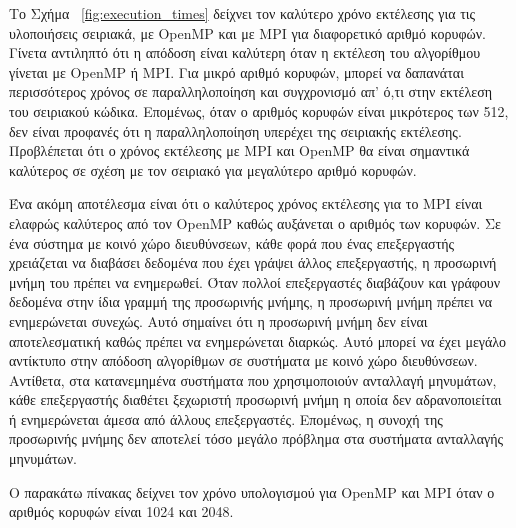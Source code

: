 \documentclass[12pt,a4paper]{article}
\begin{document}
 
Το Σχήμα ~\ref{fig:execution_times} δείχνει τον καλύτερο χρόνο εκτέλεσης για τις υλοποιήσεις σειριακά, με \foreignlanguage{english}{OpenMP} και με \foreignlanguage{english}{MPI} για διαφορετικό αριθμό κορυφών. Γίνετα αντιληπτό ότι η απόδοση είναι καλύτερη όταν η εκτέλεση του αλγορίθμου γίνεται με \foreignlanguage{english}{OpenMP} ή \foreignlanguage{english}{MPI}. Για μικρό αριθμό κορυφών, μπορεί να δαπανάται περισσότερος χρόνος σε παραλληλοποίηση και συγχρονισμό απ' ό,τι στην εκτέλεση του σειριακού κώδικα. Επομένως, όταν ο αριθμός κορυφών είναι μικρότερος των 512, δεν είναι προφανές ότι η παραλληλοποίηση υπερέχει της σειριακής εκτέλεσης. Προβλέπεται ότι ο χρόνος εκτέλεσης με \foreignlanguage{english}{MPI} και \foreignlanguage{english}{OpenMP} θα είναι σημαντικά καλύτερος σε σχέση με τον σειριακό για μεγαλύτερο αριθμό κορυφών.

Ένα ακόμη αποτέλεσμα είναι ότι ο καλύτερος χρόνος εκτέλεσης για το \foreignlanguage{english}{MPI} είναι ελαφρώς καλύτερος από τον \foreignlanguage{english}{OpenMP} καθώς αυξάνεται ο αριθμός των κορυφών. Σε ένα σύστημα με κοινό χώρο διευθύνσεων, κάθε φορά που ένας επεξεργαστής χρειάζεται να διαβάσει δεδομένα που έχει γράψει άλλος επεξεργαστής, η προσωρινή μνήμη του πρέπει να ενημερωθεί. Όταν πολλοί επεξεργαστές διαβάζουν και γράφουν δεδομένα στην ίδια γραμμή της προσωρινής μνήμης, η προσωρινή μνήμη πρέπει να ενημερώνεται συνεχώς. Αυτό σημαίνει ότι η προσωρινή μνήμη δεν είναι αποτελεσματική καθώς πρέπει να ενημερώνεται διαρκώς. Αυτό μπορεί να έχει μεγάλο αντίκτυπο στην απόδοση αλγορίθμων σε συστήματα με κοινό χώρο διευθύνσεων. Αντίθετα, στα κατανεμημένα συστήματα που χρησιμοποιούν ανταλλαγή μηνυμάτων, κάθε επεξεργαστής διαθέτει ξεχωριστή προσωρινή μνήμη η οποία δεν αδρανοποιείται ή ενημερώνεται άμεσα από άλλους επεξεργαστές. Επομένως, η συνοχή της προσωρινής μνήμης δεν αποτελεί τόσο μεγάλο πρόβλημα στα συστήματα ανταλλαγής μηνυμάτων.

Ο παρακάτω πίνακας δείχνει τον χρόνο υπολογισμού για \foreignlanguage{english}{OpenMP} και \foreignlanguage{english}{MPI} όταν ο αριθμός κορυφών είναι 1024 και 2048.
\vspace{0.2cm}
\end{document}
